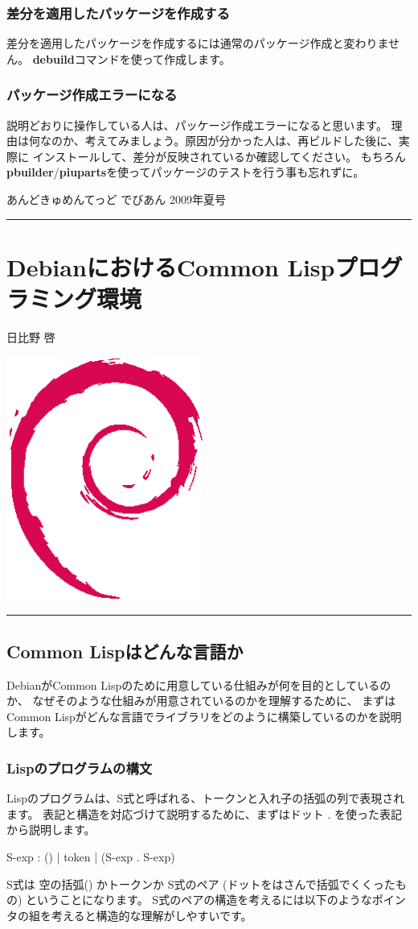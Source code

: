 \documentclass[mingoth,a4paper]{jsarticle}
\renewcommand{\dancersection}[2]{%
\newpage
あんどきゅめんてっど でびあん 2009年夏号
%
\vspace{0.1mm}\\
{\color{dancerlightblue}\rule{\hsize}{2mm}}

%
%
\begin{minipage}[t]{0.6\hsize}
\color{dancerdarkblue}
\vspace{1cm}
\section{#1}
\hfill{}#2\\
\end{minipage}
\begin{minipage}[t]{0.4\hsize}
\vspace{-2cm}
\hfill{}\includegraphics[height=8cm]{image200502/openlogo-nd.eps}\\
\vspace{-5cm}
\end{minipage}
%
%
{\color{dancerdarkblue}\rule{0.74\hsize}{2mm}}
%
\vspace{2cm}
}
\begin{document}
\subsubsection{差分を適用したパッケージを作成する}
差分を適用したパッケージを作成するには通常のパッケージ作成と変わりません。
{\bf debuild}コマンドを使って作成します。

\subsubsection{パッケージ作成エラーになる}
説明どおりに操作している人は、パッケージ作成エラーになると思います。
理由は何なのか、考えてみましょう。原因が分かった人は、再ビルドした後に、実際に
インストールして、差分が反映されているか確認してください。
もちろん{\bf pbuilder}/{\bf piuparts}を使ってパッケージのテストを行う事も忘れずに。

\dancersection{DebianにおけるCommon Lispプログラミング環境}{日比野 啓}

\subsection{Common Lispはどんな言語か}

DebianがCommon Lispのために用意している仕組みが何を目的としているのか、
なぜそのような仕組みが用意されているのかを理解するために、
まずはCommon Lispがどんな言語でライブラリをどのように構築しているのかを説明します。

\subsubsection{Lispのプログラムの構文}

Lispのプログラムは、S式と呼ばれる、トークンと入れ子の括弧の列で表現されます。
表記と構造を対応づけて説明するために、まずはドット . を使った表記から説明します。

\begin{commandline}
 S-exp  : () | token | (S-exp . S-exp)
\end{commandline}

S式は 空の括弧() かトークンか S式のペア (ドットをはさんで括弧でくくったもの) ということになります。
S式のペアの構造を考えるには以下のようなポインタの組を考えると構造的な理解がしやすいです。
\end{document}
